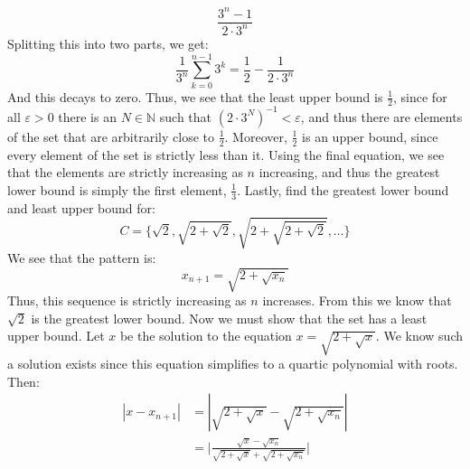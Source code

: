 \begin{lexample}
\begin{equation}
                    \frac{3^{n}-1}{2\cdot{3}^{n}}
                \end{equation}
                Splitting this into two parts, we get:
                \begin{equation}
                    \frac{1}{3^{n}}\sum_{k=0}^{n-1}3^{k}=
                    \frac{1}{2}-\frac{1}{2\cdot{3}^{n}}
                \end{equation}
                And this decays to zero. Thus, we see that the
                least upper bound is $\frac{1}{2}$, since for all
                $\varepsilon>0$ there is an $N\in\mathbb{N}$ such
                that $(2\cdot{3^{N}})^{\minus{1}}<\varepsilon$,
                and thus there are elements of the set that are
                arbitrarily close to $\frac{1}{2}$. Moreover,
                $\frac{1}{2}$ is an upper bound, since every
                element of the set is strictly less than it.
                Using the final equation, we see that the elements
                are strictly increasing as $n$ increasing, and
                thus the greatest lower bound is simply the
                first element, $\frac{1}{3}$. Lastly, find the
                greatest lower bound and least upper bound for:
                \begin{equation}
                    C=\{\sqrt{2},\sqrt{2+\sqrt{2}},
                        \sqrt{2+\sqrt{2+\sqrt{2}}},\dots\}
                \end{equation}
                We see that the pattern is:
                \begin{equation}
                    x_{n+1}=\sqrt{2+\sqrt{x_{n}}}
                \end{equation}
                Thus, this sequence is strictly increasing as
                $n$ increases. From this we know that
                $\sqrt{2}$ is the greatest lower bound. Now we
                must show that the set has a least upper bound.
                Let $x$ be the solution to the equation
                $x=\sqrt{2+\sqrt{x}}$. We know such a solution
                exists since this equation simplifies to a
                quartic polynomial with roots. Then:
                \begin{align}
                    |x-x_{n+1}|&=
                    |\sqrt{2+\sqrt{x}}-\sqrt{2+\sqrt{x_{n}}}|\\
                    &=\Big|\frac{\sqrt{x}-\sqrt{x_{n}}}
                        {\sqrt{2+\sqrt{x}}+\sqrt{2+\sqrt{x_{n}}}}
                    \Big|\\

\end{align}
\end{lexample}
